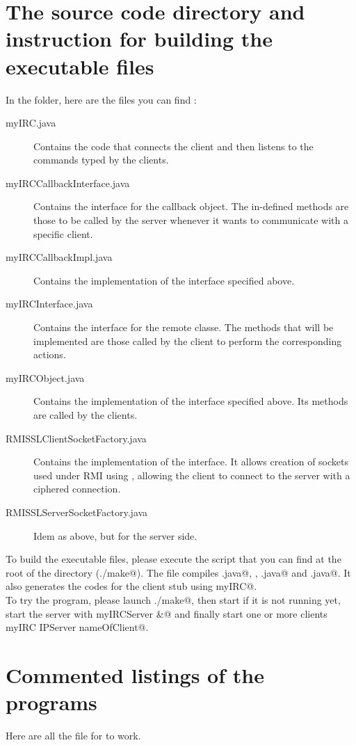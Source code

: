 \documentclass{article}
\begin{document}
\section{The source code directory and instruction for building the executable files}
In the \verb@src@ folder, here are the files you can find : 
\begin{description}
\item[myIRC.java] Contains the code that connects the client and then listens to the commands typed by the clients.
\item[myIRCCallbackInterface.java] Contains the interface for the callback object. The in-defined methods are those to be called by the server whenever it wants to communicate with a specific client.
\item[myIRCCallbackImpl.java] Contains the implementation of the interface specified above.
\item[myIRCInterface.java] Contains the interface for the remote classe. The methods that will be implemented are those called by the client to perform the corresponding actions.
\item[myIRCObject.java] Contains the implementation of the interface specified above. Its methods are called by the clients.
\item[RMISSLClientSocketFactory.java] Contains the implementation of the \verb@RMIClientSocketFactory@ interface. It allows creation of sockets used under RMI using \verb@SSLSocketFactory@, allowing the client to connect to the server with a ciphered connection.
\item[RMISSLServerSocketFactory.java] Idem as above, but for the server side.
\end{description}

To build the executable files, please execute the script \verb@make@ that you can find at the root of the directory (\verb@./make@). The \verb@make@ file compiles \verb@myIRCObject.java@, \verb@myIRCCallbackImpl@, \verb@myIRCServer.java@ and \verb@myIRC.java@. It also generates the codes for the client stub using \verb@rmic myIRC@.\\

To try the program, please launch \verb@./make@, then start \verb@rmiregistry@ if it is not running yet, start the server with \verb@java myIRCServer &@ and finally start one or more clients \verb@java myIRC IPServer nameOfClient@.

\section{Commented listings of the programs}
Here are all the file for \verb@myIRC@ to work.
\end{document}
